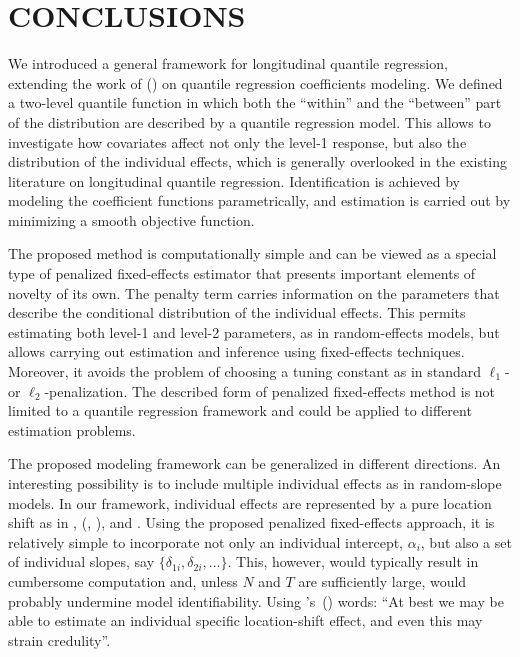 \documentclass[12pt]{article}
\newcommand\cites[1]{\citeauthor{#1}'s\ (\citeyear{#1})}
\begin{document}
\clearpage
\section{CONCLUSIONS}

We introduced a general framework for longitudinal quantile regression, extending the work of \citeauthor{iqr} (\citeyear{iqr, ctiqr})
on quantile regression coefficients modeling. 
We defined a two-level quantile function in which both the ``within'' and the ``between'' part of the distribution are 
described by a quantile regression model. This allows to investigate how covariates affect not only the level-1 response,
but also the distribution of the individual effects, which is generally overlooked in the existing literature on longitudinal 
quantile regression.
Identification is achieved by modeling the coefficient functions parametrically, and estimation is carried out
by minimizing a smooth objective function.



The proposed method is computationally simple and can be viewed as a 
special type of penalized fixed-effects estimator that presents important elements of novelty of its own.
The penalty term carries information on the parameters that describe the conditional distribution
of the individual effects. This permits estimating both level-1 and level-2 parameters, as in random-effects models,
but allows carrying out estimation and inference using fixed-effects techniques. Moreover, it avoids the problem of choosing
a tuning constant as in standard $\ell_1$- or $\ell_2$-penalization. The described form
of penalized fixed-effects method is not limited to a quantile regression framework and could be applied
to different estimation problems.

The proposed modeling framework can be generalized in different directions. 
An interesting possibility is to include multiple individual effects as in random-slope models.
In our framework, individual effects are represented by a pure location shift as in \cite{koenker2004},
\citeauthor{geraci} (\citeyear{geraci}, \citeyear{geraci2}), and \cite{canay}. Using the proposed
penalized fixed-effects approach, it is relatively simple to incorporate
not only an individual intercept, $\alpha_i$, but also a set of individual slopes, say $\{\delta_{1i}, \delta_{2i}, \ldots\}$.
This, however, would typically result in cumbersome computation and, unless
$N$ and $T$ are sufficiently large, would probably undermine model identifiability.
Using \cites{koenker2004} words: ``At best we may be able to estimate an individual specific location-shift effect, 
and even this may strain credulity''. 
\end{document}
